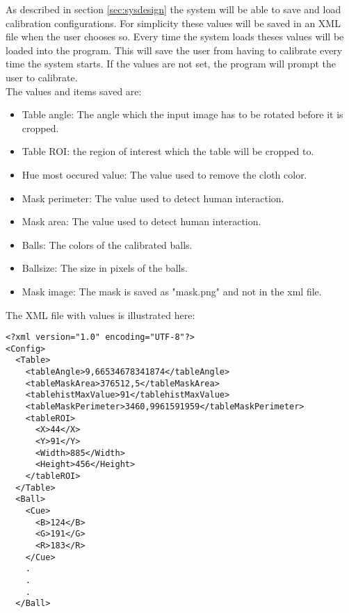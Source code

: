 As described in section \ref{sec:sysdesign} the system will be able to save and load calibration configurations. For simplicity these values will be saved in an XML file when the user chooses so. Every time the system loads theses values will be loaded into the program. This will save the user from having to calibrate every time the system starts. If the values are not set, the program will prompt the user to calibrate.\\

The values and items saved are:
\begin{itemize}
	\item Table angle: The angle which the input image has to be rotated before it is cropped.
	\item Table ROI: the region of interest which the table will be cropped to.
	\item Hue most occured value: The value used to remove the cloth color.
	\item Mask perimeter: The value used to detect human interaction.
	\item Mask area: The value used to detect human interaction.
	\item Balls: The colors of the calibrated balls.
	\item Ballsize: The size in pixels of the balls.
	\item Mask image: The mask is saved as "mask.png" and not in the xml file.
\end{itemize}

The XML file with values is illustrated here:

\lstset{language=XML}
\begin{lstlisting}
<?xml version="1.0" encoding="UTF-8"?>
<Config>
  <Table>
    <tableAngle>9,66534678341874</tableAngle>
    <tableMaskArea>376512,5</tableMaskArea>
    <tablehistMaxValue>91</tablehistMaxValue>
    <tableMaskPerimeter>3460,9961591959</tableMaskPerimeter>
    <tableROI>
      <X>44</X>
      <Y>91</Y>
      <Width>885</Width>
      <Height>456</Height>
    </tableROI>
  </Table>
  <Ball>
    <Cue>
      <B>124</B>
      <G>191</G>
      <R>183</R>
    </Cue>
    .
    .
    .
  </Ball>
\end{lstlisting}

